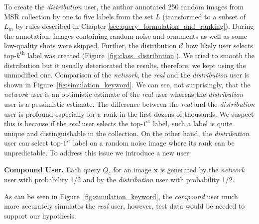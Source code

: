 To create the \textit{distribution} user, the author annotated 250 random images from MSR collection by one to five labels from the set $L$ (transformed to a subset of $L_m$ by rules described in Chapter \ref{sec:query_formulation_and_ranking}). During the annotation, images containing random noise and ornaments as well as some low-quality shots were skipped. Further, the distribution $\mathcal{C}$ how likely user selects top-$k^{\mathrm{th}}$ label was created (Figure~\ref{fig:class_distribution}). We tried to smooth the distribution but it usually deteriorated the results, therefore, we kept using the unmodified one. Comparison of the \textit{network}, the \textit{real} and the \textit{distribution} user is shown in Figure~\ref{fig:simulation_keyword}. We can see, not surprisingly, that the \textit{network} user is an optimistic estimate of the \textit{real} user whereas the \textit{distribution} user is a pessimistic estimate. The difference between the \textit{real} and the \textit{distribution} user is profound especially for a rank in the first dozens of thousands. We suspect this is because if the \textit{real} user selects the top-$1^{\mathrm{st}}$ label, such a label is quite unique and distinguishable in the collection. On the other hand, the \textit{distribution} user can select top-$1^{\mathrm{st}}$ label on a random noise image where its rank can be unpredictable. To address this issue we introduce a new user:
\begin{description}[labelwidth=1em, leftmargin=!]
	\item \textbf{Compound User.} Each query $Q_c$ for an image $\bm{x}$ is generated by the \textit{network} user with probability 1/2 and by the \textit{distribution} user with probability 1/2.
\end{description}
As can be seen in Figure~\ref{fig:simulation_keyword}, the \textit{compound} user much more accurately simulates the \textit{real} user, however, test data would be needed to support our hypothesis. 

